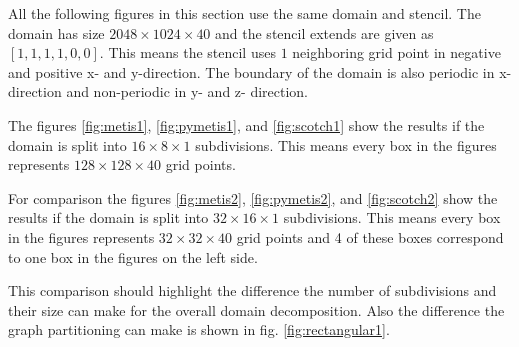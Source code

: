 All the following figures in this section use the same domain and stencil.
The domain has size $2048 \times 1024 \times 40$ and the stencil extends are given as $\left[1, 1, 1, 1, 0, 0\right]$.
This means the stencil uses $1$ neighboring grid point in negative and positive x- and y-direction.
The boundary of the domain is also periodic in x-direction and non-periodic in y- and z- direction.

The figures \ref{fig:metis1}, \ref{fig:pymetis1}, and \ref{fig:scotch1} show the results if the domain is split into $16 \times 8 \times 1$ subdivisions.
This means every box in the figures represents $128 \times 128 \times 40$ grid points.

For comparison the figures \ref{fig:metis2}, \ref{fig:pymetis2}, and \ref{fig:scotch2} show the results if the domain is split into $32 \times 16 \times 1$ subdivisions.
This means every box in the figures represents $32 \times 32 \times 40$ grid points and 4 of these boxes correspond to one box in the figures on the left side.

This comparison should highlight the difference the number of subdivisions and their size can make for the overall domain decomposition.
Also the difference the graph partitioning can make is shown in fig. \ref{fig:rectangular1}.


